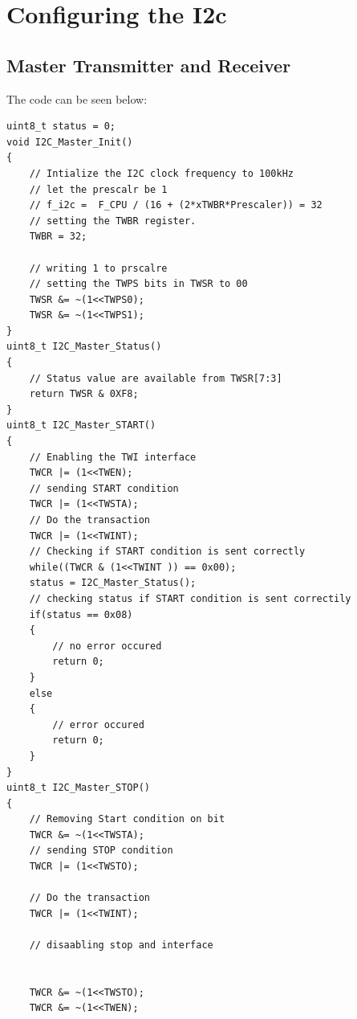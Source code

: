 \documentclass{article}
\begin{document}
\section{Configuring the I2c}
\subsection{Master Transmitter and Receiver}

\quad The code can be seen below:

\begin{verbatim}
uint8_t status = 0;
void I2C_Master_Init()
{
	// Intialize the I2C clock frequency to 100kHz
	// let the prescalr be 1
	// f_i2c =  F_CPU / (16 + (2*xTWBR*Prescaler)) = 32
	// setting the TWBR register.
	TWBR = 32;

	// writing 1 to prscalre
	// setting the TWPS bits in TWSR to 00
	TWSR &= ~(1<<TWPS0);
	TWSR &= ~(1<<TWPS1);
}
uint8_t I2C_Master_Status()
{
	// Status value are available from TWSR[7:3]
	return TWSR & 0XF8;
}
uint8_t I2C_Master_START()
{
	// Enabling the TWI interface
	TWCR |= (1<<TWEN);
	// sending START condition
	TWCR |= (1<<TWSTA);
	// Do the transaction
	TWCR |= (1<<TWINT);
	// Checking if START condition is sent correctly
	while((TWCR & (1<<TWINT )) == 0x00);
	status = I2C_Master_Status();
	// checking status if START condition is sent correctily
	if(status == 0x08)
	{
		// no error occured
		return 0;
	}
	else
	{
		// error occured
		return 0;
	}
}
uint8_t I2C_Master_STOP()
{
	// Removing Start condition on bit
	TWCR &= ~(1<<TWSTA);
	// sending STOP condition
	TWCR |= (1<<TWSTO);
	
	// Do the transaction
	TWCR |= (1<<TWINT);

	// disaabling stop and interface
	
	
	TWCR &= ~(1<<TWSTO);
	TWCR &= ~(1<<TWEN);


\end{verbatim}
\end{document}
